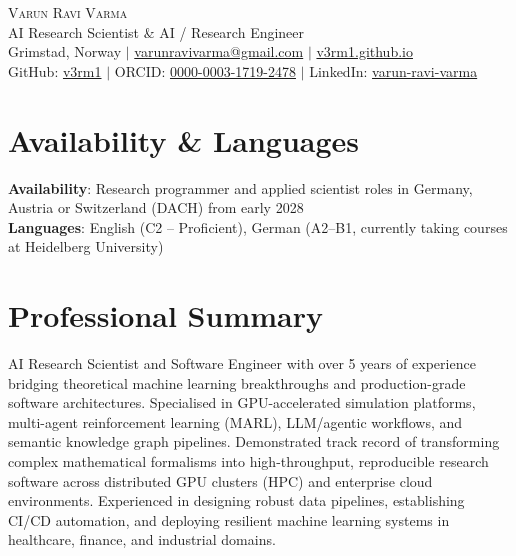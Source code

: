 \documentclass[10pt,a4paper]{article}
\begin{document}

\begin{center}
    {\Huge \scshape Varun Ravi Varma} \\ \vspace{2pt}
    {\large AI Research Scientist \& AI / Research Engineer} \\ \vspace{3pt}
    \small Grimstad, Norway $|$ \href{mailto:varunravivarma@gmail.com}{varunravivarma@gmail.com} $|$ \href{https://v3rm1.github.io/}{v3rm1.github.io} \\
    GitHub: \href{https://github.com/v3rm1}{v3rm1} $|$ ORCID: \href{https://orcid.org/0000-0003-1719-2478}{0000-0003-1719-2478} $|$ LinkedIn: \href{https://www.linkedin.com/in/varun-ravi-varma}{varun-ravi-varma}
\end{center}

\section{Availability \& Languages}
\begin{itemize}[leftmargin=0.15in, label={}]
    \small{\item{
     \textbf{Availability}{: Research programmer and applied scientist roles in Germany, Austria or Switzerland (DACH) from early 2028} \\
     \textbf{Languages}{: English (C2 -- Proficient), German (A2--B1, currently taking courses at Heidelberg University)}
    }}
\end{itemize}

\section{Professional Summary}
AI Research Scientist and Software Engineer with over 5 years of experience bridging theoretical machine learning breakthroughs and production-grade software architectures.
Specialised in GPU-accelerated simulation platforms, multi-agent reinforcement learning (MARL), LLM/agentic workflows, and semantic knowledge graph pipelines.
Demonstrated track record of transforming complex mathematical formalisms into high-throughput, reproducible research software across distributed GPU clusters (HPC) and enterprise cloud environments.
Experienced in designing robust data pipelines, establishing CI/CD automation, and deploying resilient machine learning systems in healthcare, finance, and industrial domains.
\end{document}
